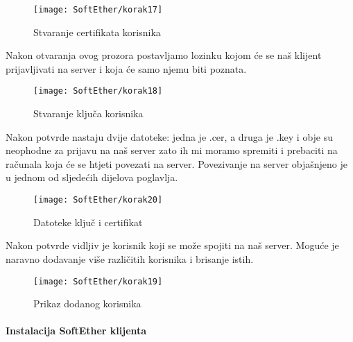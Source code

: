 \begin{figure}[h!]
     \centering
     \texttt{[image: SoftEther/korak17]}
     \caption{Stvaranje certifikata korisnika}
\end{figure}
\FloatBarrier
Nakon otvaranja ovog prozora postavljamo lozinku kojom će se naš klijent prijavljivati na server i koja će samo njemu biti poznata.
\begin{figure}[h!]
     \centering
     \texttt{[image: SoftEther/korak18]}
     \caption{Stvaranje ključa korisnika}
\end{figure}
\FloatBarrier
Nakon potvrde nastaju dvije datoteke: jedna je .cer, a druga je .key i obje su neophodne za prijavu na naš server zato ih mi moramo spremiti i prebaciti na računala koja će se htjeti povezati na server. Povezivanje na server objašnjeno je u jednom od sljedećih dijelova poglavlja.
\begin{figure}[h!]
     \centering
     \texttt{[image: SoftEther/korak20]}
     \caption{Datoteke ključ i certifikat}
\end{figure}
\FloatBarrier
Nakon potvrde vidljiv je korisnik koji se može spojiti na naš server. Moguće je naravno dodavanje više različitih korisnika i brisanje istih.
\begin{figure}[h!]
     \centering
     \texttt{[image: SoftEther/korak19]}
     \caption{Prikaz dodanog korisnika}
\end{figure}
\FloatBarrier

\newpage
\paragraph*{Instalacija SoftEther klijenta}

